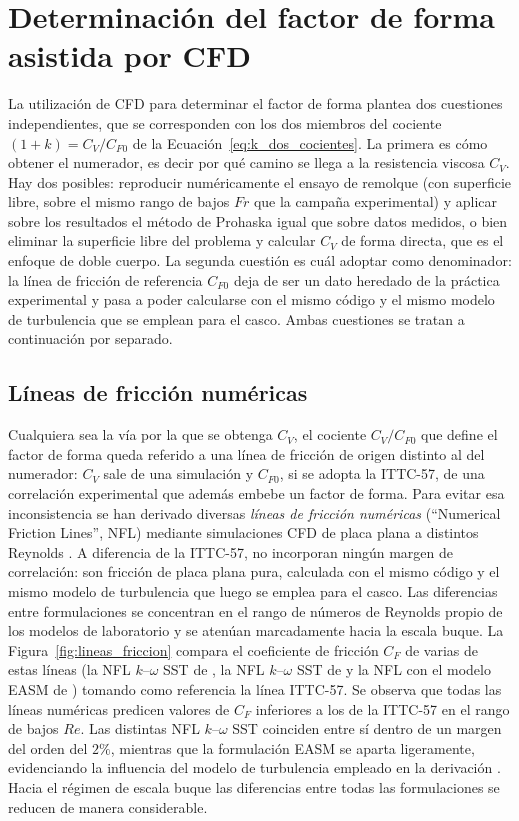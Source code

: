 \section{Determinación del factor de forma asistida por CFD}
\label{sec:cfd_ff_antec}

La utilización de CFD para determinar el factor de forma plantea dos cuestiones
independientes, que se corresponden con los dos miembros del cociente
$(1+k) = C_V/C_{F0}$ de la Ecuación~\eqref{eq:k_dos_cocientes}. La primera es
cómo obtener el numerador, es decir por qué camino se llega a la resistencia
viscosa $C_V$. Hay dos posibles: reproducir numéricamente el ensayo de remolque
(con superficie libre, sobre el mismo rango de bajos $Fr$ que la campaña
experimental) y aplicar sobre los resultados el método de Prohaska igual que
sobre datos medidos, o bien eliminar la superficie libre del problema y calcular
$C_V$ de forma directa, que es el enfoque de doble cuerpo. La segunda cuestión es
cuál adoptar como denominador: la línea de fricción de referencia $C_{F0}$ deja
de ser un dato heredado de la práctica experimental y pasa a poder calcularse con
el mismo código y el mismo modelo de turbulencia que se emplean para el casco.
Ambas cuestiones se tratan a continuación por separado.

\subsection{Líneas de fricción numéricas}
\label{sec:nfl_antec}

Cualquiera sea la vía por la que se obtenga $C_V$, el cociente $C_V/C_{F0}$ que
define el factor de forma queda referido a una línea de fricción de origen
distinto al del numerador: $C_V$ sale de una simulación y $C_{F0}$, si se adopta
la ITTC-57, de una correlación experimental que además embebe un factor de forma.
Para evitar esa inconsistencia se han derivado diversas \emph{líneas de fricción numéricas}
(``Numerical Friction Lines'', NFL) mediante simulaciones CFD de placa plana a
distintos Reynolds \citep{wang2015numericalFL, Korkmaz2019NumericalFL}. A
diferencia de la ITTC-57, no incorporan ningún margen de correlación: son
fricción de placa plana pura, calculada con el mismo código y el mismo modelo de
turbulencia que luego se emplea para el casco. Las
diferencias entre formulaciones se concentran en el rango de números de Reynolds
propio de los modelos de laboratorio y se atenúan marcadamente hacia la escala
buque. La Figura~\ref{fig:lineas_friccion} compara el coeficiente de fricción
$C_F$ de varias de estas líneas (la NFL $k$--$\omega$ SST de
\citet{wang2015numericalFL}, la NFL $k$--$\omega$ SST de \citet{eca2008friction}
y la NFL con el modelo EASM de \citet{Korkmaz2019NumericalFL}) tomando como
referencia la línea ITTC-57. Se observa que todas las líneas numéricas predicen
valores de $C_F$ inferiores a los de la ITTC-57 en el rango de bajos $Re$. Las
distintas NFL $k$--$\omega$ SST coinciden entre sí dentro de un margen del orden
del $2\%$, mientras que la formulación EASM se aparta ligeramente, evidenciando
la influencia del modelo de turbulencia empleado en la derivación
\citep{korkmaz2023thesis}. Hacia el régimen de escala buque las diferencias
entre todas las formulaciones se reducen de manera considerable.

